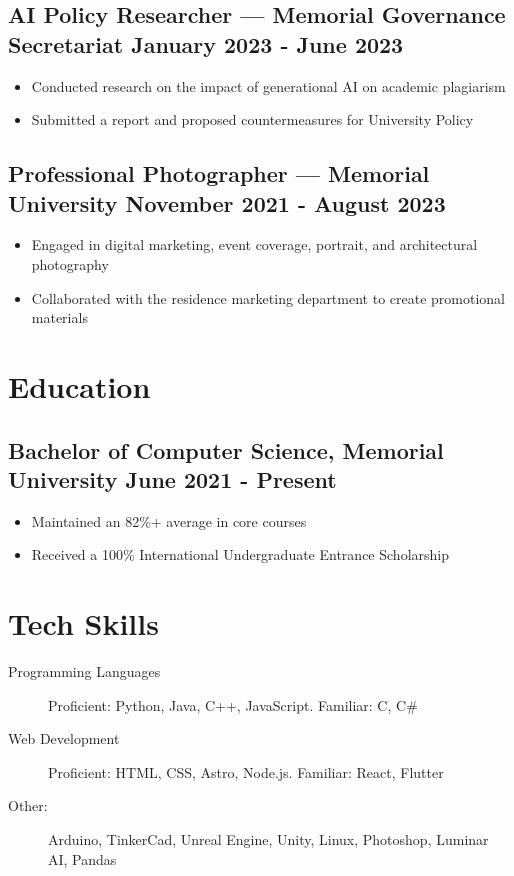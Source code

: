 \documentclass[10pt]{article}
\begin{document}
\subsection{AI Policy Researcher — Memorial Governance Secretariat \hfill January 2023 - June 2023}
\begin{itemize}
    \item Conducted research on the impact of generational AI on academic plagiarism
    \item Submitted a report and proposed countermeasures for University Policy
\end{itemize}

\subsection{Professional Photographer — Memorial University \hfill November 2021 - August 2023}
\begin{itemize}
    \item Engaged in digital marketing, event coverage, portrait, and architectural photography
    \item Collaborated with the residence marketing department to create promotional materials
\end{itemize}

\section{Education}
\subsection{Bachelor of Computer Science, Memorial University \hfill June 2021 - Present}
\begin{itemize}
    \item Maintained an 82\%+ average in core courses
    \item Received a 100\% International Undergraduate Entrance Scholarship
\end{itemize}

\section{Tech Skills}
\begin{description}
    \item[Programming Languages] Proficient: Python, Java, C++, JavaScript. Familiar: C, C\#
    \item[Web Development] Proficient: HTML, CSS, Astro, Node.js. Familiar: React, Flutter
    \item[Other:] Arduino, TinkerCad, Unreal Engine, Unity, Linux, Photoshop, Luminar AI, Pandas
\end{description}
\end{document}

